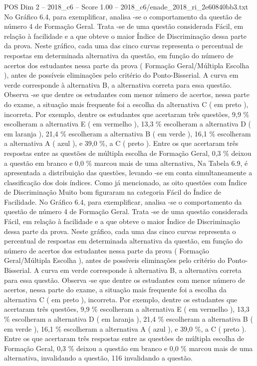 \begin{textsample}{POS Dim 2 – 2018\_c6 – Score 1.00 – 2018\_c6/enade\_2018\_ri\_2e60840bb3.txt}
No Gráfico 6.4, para exemplificar, analisa -se o comportamento da questão de número 4 de Formação Geral.
Trata -se de uma questão considerada Fácil, em relação à facilidade e a que obteve o maior Índice de Discriminação dessa parte da prova.
Neste gráfico, cada uma das cinco curvas representa o percentual de respostas em determinada alternativa da questão, em função do número de acertos dos estudantes nessa parte da prova ( Formação Geral/Múltipla Escolha ), antes de possíveis eliminações pelo critério do Ponto-Bisserial.
A curva em verde corresponde à alternativa B, a alternativa correta para essa questão.
Observa -se que dentre os estudantes com menor número de acertos, nessa parte do exame, a situação mais frequente foi a escolha da alternativa C ( em preto ), incorreta.
Por exemplo, dentre os estudantes que acertaram três questões, 9,9 \% escolheram a alternativa E ( em vermelho ), 13,3 \% escolheram a alternativa D ( em laranja ), 21,4 \% escolheram a alternativa B ( em verde ), 16,1 \% escolheram a alternativa A ( azul ), e 39,0 \%, a C ( preto ).
Entre os que acertaram três respostas entre as questões de múltipla escolha de Formação Geral, 0,3 \% deixou a questão em branco e 0,0 \% marcou mais de uma alternativa, Na Tabela 6.9, é apresentada a distribuição das questões, levando -se em conta simultaneamente a classificação dos dois índices.
Como já mencionado, as oito questões com Índice de Discriminação Muito bom figuraram na categoria Fácil do Índice de Facilidade.
No Gráfico 6.4, para exemplificar, analisa -se o comportamento da questão de número 4 de Formação Geral.
Trata -se de uma questão considerada Fácil, em relação à facilidade e a que obteve o maior Índice de Discriminação dessa parte da prova.
Neste gráfico, cada uma das cinco curvas representa o percentual de respostas em determinada alternativa da questão, em função do número de acertos dos estudantes nessa parte da prova ( Formação Geral/Múltipla Escolha ), antes de possíveis eliminações pelo critério do Ponto-Bisserial.
A curva em verde corresponde à alternativa B, a alternativa correta para essa questão.
Observa -se que dentre os estudantes com menor número de acertos, nessa parte do exame, a situação mais frequente foi a escolha da alternativa C ( em preto ), incorreta.
Por exemplo, dentre os estudantes que acertaram três questões, 9,9 \% escolheram a alternativa E ( em vermelho ), 13,3 \% escolheram a alternativa D ( em laranja ), 21,4 \% escolheram a alternativa B ( em verde ), 16,1 \% escolheram a alternativa A ( azul ), e 39,0 \%, a C ( preto ).
Entre os que acertaram três respostas entre as questões de múltipla escolha de Formação Geral, 0,3 \% deixou a questão em branco e 0,0 \% marcou mais de uma alternativa, invalidando a questão, 116 invalidando a questão.

\end{textsample}
